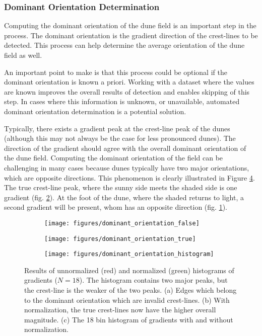 \subsubsection{Dominant Orientation Determination}

Computing the dominant orientation of the dune field is an important step in the process. The dominant orientation is the gradient direction of the crest-lines to be detected. This process can help determine the average orientation of the dune field as well. 

An important point to make is that this process could be optional if the dominant orientation is known a priori. Working with a dataset where the values are known improves the overall results of detection and enables skipping of this step. In cases where this information is unknown, or unavailable, automated dominant orientation determination is a potential solution.

Typically, there exists a gradient peak at the crest-line peak of the dunes (although this may not always be the case for less pronounced dunes). The direction of the gradient should agree with the overall dominant orientation of the dune field. Computing the dominant orientation of the field can be challenging in many cases because dunes typically have two major orientations, which are opposite directions. This phenomenon is clearly illustrated in Figure \ref{fig:computing_dominant_orientation}. The true crest-line peak, where the sunny side meets the shaded side is one gradient (fig. \ref{fig:true_dominant_orientation_image}). At the foot of the dune, where the shaded returns to light, a second gradient will be present, whom has an opposite direction (fig. \ref{fig:false_dominant_orientation_image}).

\begin{figure}
	\centering
	\begin{subfigure}{0.48\textwidth}
		\centering
		\texttt{[image: figures/dominant\_orientation\_false]}
		\caption{}
		\label{fig:false_dominant_orientation_image}
	\end{subfigure}
	\begin{subfigure}{0.48\textwidth}
		\centering
		\texttt{[image: figures/dominant\_orientation\_true]}
		\caption{}
		\label{fig:true_dominant_orientation_image}
	\end{subfigure}
	\begin{subfigure}{\textwidth}
		\centering
		\texttt{[image: figures/dominant\_orientation\_histogram]}
		\caption{}
		\label{fig:dominant_orientation_histogram}
	\end{subfigure}
	
	\caption{Results of unnormalized (red) and normalized (green) histograms of gradients ($N=18$). The histogram contains two major peaks, but the crest-line is the weaker of the two peaks. (a) Edges which belong to the dominant orientation which are invalid crest-lines. (b) With normalization, the true crest-lines now have the higher overall magnitude. (c) The 18 bin histogram of gradients with and without normalization.}
	\label{fig:computing_dominant_orientation}
\end{figure}

